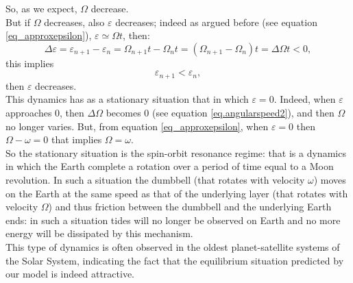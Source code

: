 \documentclass[11pt, oneside,reqno]{amsart}
\begin{document}
So, as we expect, $\Omega$ decrease.\\
But if $\Omega$ decreases, also $\varepsilon$ decreases; indeed as argued before (see equation \eqref{eq_approxepsilon}), $\varepsilon \simeq \Omega t$, then:
\begin{equation}
    \Delta \varepsilon = \varepsilon_{n+1} - \varepsilon_n = \Omega_{n+1} t - \Omega_n t  = (\Omega_{n+1} - \Omega_n)t = \Delta \Omega t < 0, 
\end{equation}
this implies
\begin{equation}\label{eq.epsilondecreases}
    \varepsilon_{n+1} < \varepsilon_n,
\end{equation}  
then $\varepsilon$ decreases.\\
This dynamics has as a stationary situation that in which $\varepsilon = 0$. Indeed, when $\varepsilon$ approaches $0$, then $\Delta \Omega$ becomes $0$ (see equation \eqref{eq.angularspeed2}), and then $\Omega$ no longer varies. But, from equation \eqref{eq_approxepsilon}, when $\varepsilon=0$ then $\Omega - \omega = 0$ that implies $\Omega = \omega$.\\
So the stationary situation is the spin-orbit resonance regime: that is a dynamics in which the Earth complete a rotation over a period of time equal to a Moon revolution. In such a situation the dumbbell (that rotates with velocity $\omega$) moves on the Earth at the same speed as that of the underlying layer (that rotates with velocity $\Omega$) and thus friction between the dumbbell and the underlying Earth ends: in such a situation tides will no longer be observed on Earth and no more energy will be dissipated by this mechanism.\\ 
This type of dynamics is often observed in the oldest planet-satellite systems of the Solar System, indicating the fact that the equilibrium situation predicted by our model is indeed attractive.\\


\appendix
\end{document}
